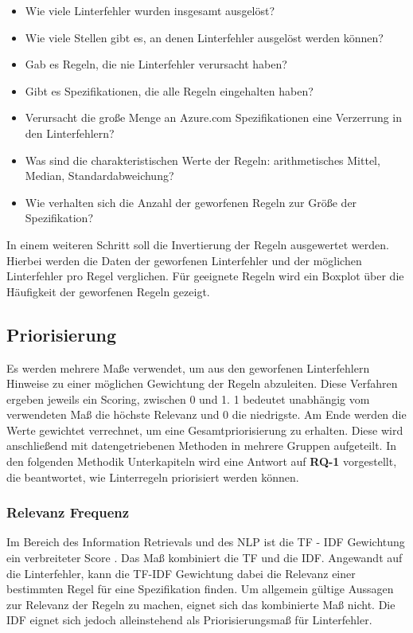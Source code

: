 \begin{itemize}
  \item Wie viele Linterfehler wurden insgesamt ausgelöst?
  \item Wie viele Stellen gibt es, an denen Linterfehler ausgelöst werden können?
  \item Gab es Regeln, die nie Linterfehler verursacht haben?
  \item Gibt es Spezifikationen, die alle Regeln eingehalten haben?
  \item Verursacht die große Menge an Azure.com Spezifikationen eine Verzerrung in den Linterfehlern?
  \item Was sind die charakteristischen Werte der Regeln: arithmetisches Mittel, Median, Standardabweichung?
  \item Wie verhalten sich die Anzahl der geworfenen Regeln zur Größe der Spezifikation?
\end{itemize}

In einem weiteren Schritt soll die Invertierung der Regeln ausgewertet werden. Hierbei werden die Daten der geworfenen Linterfehler und der möglichen Linterfehler pro Regel verglichen. Für geeignete Regeln wird ein Boxplot über die Häufigkeit der geworfenen Regeln gezeigt.


\subsection{Priorisierung} \label{sec:methodpriorisierung}
Es werden mehrere Maße verwendet, um aus den geworfenen Linterfehlern Hinweise zu einer möglichen Gewichtung der Regeln abzuleiten. Diese Verfahren ergeben jeweils ein Scoring, zwischen 0 und 1. 1 bedeutet unabhängig vom verwendeten Maß die höchste Relevanz und 0 die niedrigste.  Am Ende werden die Werte gewichtet verrechnet, um eine Gesamtpriorisierung zu erhalten. Diese wird anschließend mit datengetriebenen Methoden in mehrere Gruppen aufgeteilt. In den folgenden Methodik Unterkapiteln wird eine Antwort auf \textbf{RQ-1} vorgestellt, die beantwortet, wie Linterregeln priorisiert werden können. 


\subsubsection{Relevanz Frequenz} \label{sec:inversedocumentfrequency}
Im Bereich des Information Retrievals und des \acs{NLP} ist die \acf{TF} - \acf{IDF} Gewichtung ein verbreiteter Score \parencite{manning_introduction_2008}. Das Maß kombiniert die \acl{TF} und die \acl{IDF}. Angewandt auf die Linterfehler, kann die \acs{TF}-\acs{IDF} Gewichtung dabei die Relevanz einer bestimmten Regel für eine Spezifikation finden. Um allgemein gültige Aussagen zur Relevanz der Regeln zu machen, eignet sich das kombinierte Maß nicht. Die \acl{IDF} eignet sich jedoch alleinstehend als Priorisierungsmaß für Linterfehler.

